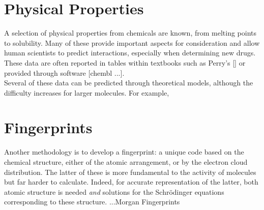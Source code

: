 \section{Physical Properties}
A selection of physical properties from chemicals are known, from melting points to solubility. Many of these provide important aspects for consideration and allow human scientists to predict interactions, especially when determining new drugs. These data are often reported in tables within textbooks such as Perry's [] or provided through software [chembl ...].
\\
Several of these data can be predicted through theoretical models, although the difficulty increases for larger molecules. For example,
\blindtext[1]
\section{Fingerprints}
Another methodology is to develop a fingerprint: a unique code based on the chemical structure, either of the atomic arrangement, or by the electron cloud distribution. The latter of these is more fundamental to the activity of molecules but far harder to calculate. Indeed, for accurate representation of the latter, both atomic structure is needed \textit{and} solutions for the Schrödinger equations corresponding to these structure.
...Morgan Fingerprints

